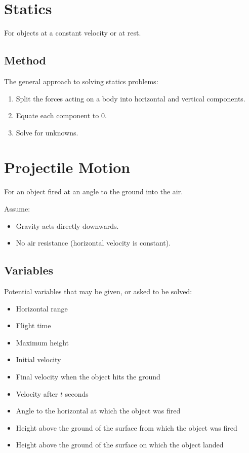 \documentclass[a4paper,11pt]{report}
\begin{document}
\section{Statics}

For objects at a constant velocity or at rest.

\subsection{Method}

The general approach to solving statics problems:

\begin{enumerate}
\item Split the forces acting on a body into horizontal and vertical components.
\item Equate each component to 0.
\item Solve for unknowns.
\end{enumerate}


\section{Projectile Motion}

For an object fired at an angle to the ground into the air.

Assume:

\begin{itemize}
\item Gravity acts directly downwards.
\item No air resistance (horizontal velocity is constant).
\end{itemize}

\subsection{Variables}

Potential variables that may be given, or asked to be solved:

\begin{itemize}
\item Horizontal range
\item Flight time
\item Maximum height
\item Initial velocity
\item Final velocity when the object hits the ground
\item Velocity after $t$ seconds
\item Angle to the horizontal at which the object was fired
\item Height above the ground of the surface from which the object was fired
\item Height above the ground of the surface on which the object landed
\end{itemize}
\end{document}
